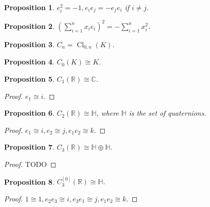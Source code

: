 \documentclass[12pt, letterpaper]{article}
\newcommand{\re}{\mathbb{R}}
\newcommand{\co}{\mathbb{C}}
\newcommand{\Cl}{\operatorname{Cl}}
\newcommand{\red}[1]{{\color{red} #1}}
\newtheorem{prop}{Proposition}[section]
\theoremstyle{definition}
\theoremstyle{remark}
\theoremstyle{definition}
\theoremstyle{plain}
\numberwithin{equation}{section}
\begin{document}
	\begin{prop}
		$e_i^2=-1,e_ie_j=-e_je_i$ if $i\ne j$.
	\end{prop}
	\begin{prop}
		$\left(\sum_{i=1}^{n}x_ie_i\right)^2=-\sum_{i=1}^nx_i^2$.
	\end{prop}
	\begin{prop}
		$C_n=\Cl_{0,n}(K)$.
	\end{prop}

	\begin{prop}
		$C_0(K)\cong K$.
	\end{prop}

	\begin{prop}
		$C_1(\re)\cong \co$.
	\end{prop}
	\begin{proof}
		$e_1\cong i$.
	\end{proof}
	\begin{prop}
		$C_2(\re)\cong \mathbb{H}$, where $\mathbb{H}$ is the set of quaternions.
	\end{prop}
	\begin{proof}
		$e_1\cong i, e_2\cong j, e_1e_2\cong k$.
	\end{proof}
	\begin{prop}
		\red{$C_3(\re)\cong \mathbb{H}\oplus\mathbb{H}$.}
	\end{prop}
	\begin{proof}
		\red{TODO}
	\end{proof}
	\begin{prop}
		$C_3^{[0]}(\re)\cong \mathbb{H}$.
	\end{prop}
	\begin{proof}
		$1\cong 1, e_2e_3\cong i, e_3e_1\cong j,e_1e_2\cong k$.
	\end{proof}
\end{document}
